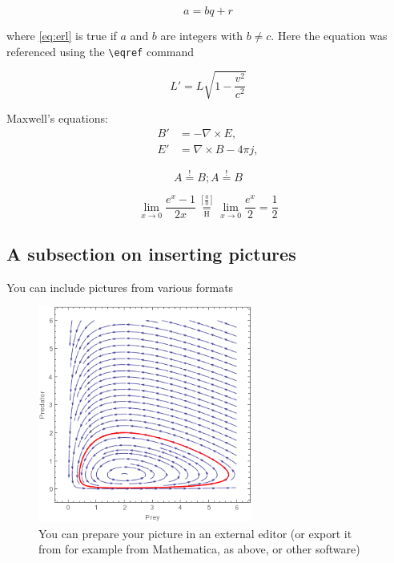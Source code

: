 \documentclass[a4paper,11pt]{article}
\numberwithin{equation}{section}
\theoremstyle{definition}
\begin{document}
\begin{equation} \label{eq:erl}
a = bq + r
\end{equation}

where \eqref{eq:erl} is true if $a$ and $b$ are integers with $b \neq
c$. Here the equation was referenced using the \verb#\eqref# command

 \begin{equation}
L' = {L}{\sqrt{1-\frac{v^2}{c^2}}}
\end{equation}

Maxwell's equations:
\begin{align}
B'&=-\nabla \times E,\\
E'&=\nabla \times B - 4\pi j,
\end{align}

\[
A \overset{!}{=} B; A \stackrel{!}{=} B
\]

\[
\lim_{x\to 0}{\frac{e^x-1}{2x}}
\overset{\left[\frac{0}{0}\right]}{\underset{\mathrm{H}}{=}}
\lim_{x\to 0}{\frac{e^x}{2}}={\frac{1}{2}}
\]

\subsection{A subsection on inserting pictures}

You can include pictures from various formats
\begin{figure}[H]
	\centering
	\includegraphics[width=7cm]{totalplot.png}
	\caption{You can prepare your picture in an external editor
          (or export it from for example from Mathematica, as above, or other software)}
	\label{fig:lotka-volterra} 
\end{figure}
\end{document}
